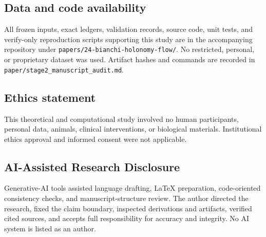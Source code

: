 \documentclass[11pt,a4paper]{article}
\theoremstyle{definition}
\theoremstyle{remark}
\begin{document}
\subsection*{Data and code availability}
All frozen inputs, exact ledgers, validation records, source code, unit tests, and verify-only reproduction scripts supporting this study are in the accompanying repository under \texttt{papers/24-bianchi-holonomy-flow/}. No restricted, personal, or proprietary dataset was used. Artifact hashes and commands are recorded in \texttt{paper/stage2\_manuscript\_audit.md}.
\subsection*{Ethics statement}
This theoretical and computational study involved no human participants, personal data, animals, clinical interventions, or biological materials. Institutional ethics approval and informed consent were not applicable.
\subsection*{AI-Assisted Research Disclosure}
Generative-AI tools assisted language drafting, LaTeX preparation, code-oriented consistency checks, and manuscript-structure review. The author directed the research, fixed the claim boundary, inspected derivations and artifacts, verified cited sources, and accepts full responsibility for accuracy and integrity. No AI system is listed as an author.



\end{document}
